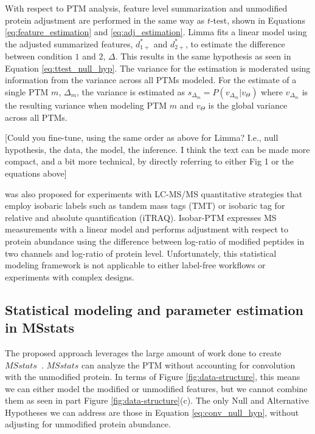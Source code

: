 \documentclass[mcp]{article}
\numberwithin{table}{section}
\def\todo#1{{\color{red}[#1]}}
\begin{document}
With respect to PTM analysis, feature level summarization and unmodified protein adjustment are performed in the same way as $t$-test, shown in Equations \ref{eq:feature_estimation} and \ref{eq:adj_estimation}. Limma fits a linear model using the adjusted summarized features, $d_{1+}^{\ast}$ and $d_{2+}^{\ast}$, to estimate the difference between condition $1$ and $2$, $\Delta$. This results in the same hypothesis as seen in Equation \ref{eq:ttest_null_hyp}. The variance for the estimation is moderated using information from the variance across all PTMs modeled. For the estimate of a single PTM $m$, $\Delta_m$, the variance is estimated as $s_{\Delta_m} = P(v_{\Delta_m}| v_\Theta)$ where $v_{\Delta_m}$ is the resulting variance when modeling PTM $m$ and $v_\Theta$ is the global variance across all PTMs.

\todo{Could you fine-tune, using the same order as above for Limma? I.e., null hypothesis, the data, the model, the inference. I think the text can be made more compact, and a bit more technical, by directly referring to either Fig 1 or the equations above}

\medskip {} was also proposed for experiments with LC-MS/MS quantitative strategies that employ isobaric labels such as tandem mass tags (TMT) or isobaric tag for relative and absolute quantification (iTRAQ)\cite{Breitwieser:2013}. Isobar-PTM expresses MS measurements with a linear model and performs adjustment with respect to protein abundance using the difference between log-ratio of modified peptides in two channels and log-ratio of protein level. Unfortunately, this statistical modeling framework is not applicable to either label-free workflows or experiments with complex designs. 


\subsection*{Statistical modeling and parameter estimation in MSstats}

The proposed approach leverages the large amount of work done to create $MSstats$~\cite{Choi:2014}. $MSstats$ can analyze the PTM without accounting for convolution with the unmodified protein. In terms of Figure \ref{fig:data-structure}, this means we can either model the modified or unmodified features, but we cannot combine them as seen in part Figure \ref{fig:data-structure}(c). The only Null and Alternative Hypotheses we can address are those in Equation \ref{eq:conv_null_hyp}, without adjusting for unmodified protein abundance.
\end{document}
